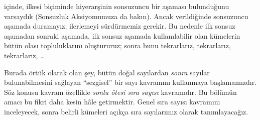



 içinde, \stagesinf{} ilkesi biçiminde hiyerarşinin
sonsuzuncu bir aşaması bulunduğunu varsaydık (Sonsuzluk Aksiyomumuza da
bakın). Ancak \stagessucc{} verildiğinde sonsuzuncu aşamada duramayız;
ilerlemeyi sürdürmemiz gerekir. Bu nedenle ilk sonsuz aşamadan sonraki
aşamada, ilk sonsuz aşamada kullanılabilir olan kümelerin bütün olası
topluluklarını oluştururuz; sonra bunu tekrarlarız, tekrarlarız,
tekrarlarız, \dots

Burada örtük olarak olan şey, bütün doğal sayılardan \emph{sonra} sayılar
bulunabilmesini sağlayan ``sezgisel'' bir sayı kavramını kullanmaya
başlamamızdır. Söz konusu kavram özellikle \emph{sonlu ötesi sıra sayısı}
kavramıdır. Bu bölümün amacı bu fikri daha kesin hâle getirmektir. Genel sıra
sayısı kavramını inceleyecek, sonra belirli kümeleri açıkça sıra sayılarımız
olarak tanımlayacağız.

